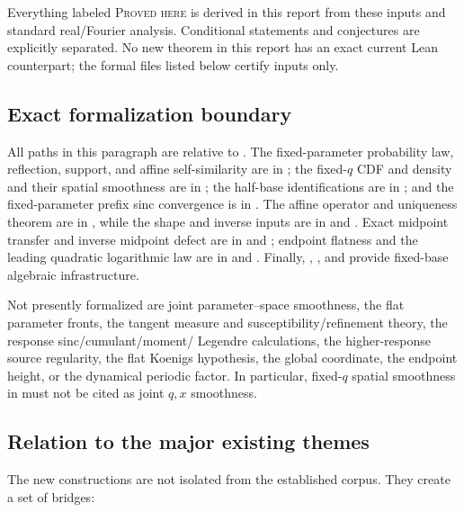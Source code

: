 \documentclass[11pt,oneside]{article}
\theoremstyle{definition}
\theoremstyle{remark}
\newcommand{\statusproved}{\textsc{Proved here}}
\begin{document}
Everything labeled \statusproved{} is derived in this report from these inputs and standard
real/Fourier analysis.  Conditional statements and conjectures are explicitly separated.  No
new theorem in this report has an exact current Lean counterpart; the formal files listed
below certify inputs only.

\subsection{Exact formalization boundary}

All paths in this paragraph are relative to
.  The fixed-parameter probability law,
reflection, support, and affine self-similarity are in
; the fixed-\(q\) CDF and density and their spatial smoothness
are in ; the half-base identifications are in
; and the fixed-parameter prefix sinc convergence is in
.  The affine operator and uniqueness theorem are in
, while the shape and inverse inputs are in
 and .  Exact midpoint transfer and inverse
midpoint defect are in  and
; endpoint flatness and the leading quadratic logarithmic law
are in  and .  Finally,
, , and
 provide fixed-base algebraic infrastructure.

Not presently formalized are joint parameter--space smoothness, the flat parameter fronts,
the tangent measure and susceptibility/refinement theory, the response sinc/cumulant/moment/
Legendre calculations, the higher-response source regularity, the flat Koenigs hypothesis,
the global coordinate, the endpoint height, or the dynamical periodic factor.  In particular,
fixed-\(q\) spatial smoothness in  must not be cited as joint
\(q,x\) smoothness.

\subsection{Relation to the major existing themes}

The new constructions are not isolated from the established corpus.  They create a set of
bridges:
\end{document}

